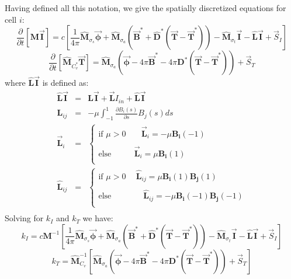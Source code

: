 \documentclass[11pt]{article}
\newcommand{\benum}{\begin{equation}}
\newcommand{\eenum}{\end{equation}}
\newcommand{\beanum}{\begin{eqnarray}}
\newcommand{\eeanum}{\end{eqnarray}}
\newcommand{\vect}[1]{\ensuremath{ \vec{\mathbf #1}}}
\newcommand{\B}[1]{\ensuremath{\mathbf{B_{#1} }}}
\newcommand{\p}{\ensuremath{ \partial}}
\newcommand{\M}{\ensuremath{ \mathbf M}}
\newcommand{\Mw}{\ensuremath{\widehat{\mathbf M}}}
\begin{document}
Having defined all this notation, we give the spatially discretized equations for cell $i$:
\benum
\frac{\p }{\p t}\left[\mathbf{M} \vect{I}  \right] = c\left[
\frac{1}{4\pi}\widehat{ \mathbf M}_{\sigma_s}\vect{\phi} + \widehat{\mathbf M}_{\sigma_a}\left(\vect{B}^* + \widehat{\mathbf D}^*\left(\vect{T} -\vect{T}^*  \right)   \right)- \widehat{\mathbf M}_{\sigma_t} \vect{I} - \widehat{ \mathbf L}\vect{I} + \vec{S}_I
\right]
\label{eq:disc-intensity}
\eenum
\benum
\frac{\p }{\p t}\left[\Mw_{C_v^*}\vect{T}   \right] = 
\Mw_{\sigma_a} \left(\vect{\phi} -4\pi\vect{B}^* - 4\pi\mathbf{D}^*\left( \vect{T} - \vect{T}^* \right)\right) + \vec{S}_T
\label{eq:disc-temperature}
\eenum
where $\widehat{ \mathbf L}\vect{I}$ is defined as:
\beanum
\widehat{\mathbf L}\vect{I} &=& \mathbf{L}\vect{I} + \vect{L}I_{in} + \hat{\mathbf L}\vect{I}\\
%
%
%
\mathbf{L}_{ij} &=& -\mu \int_{-1}^{1}{\frac{\p B_i(s)}{\p s}B_j(s) ds} \\
%
%
%
\vect{L}_i &=& \left \{
\begin{array}{cc}
\text{if }\mu>0  ~&~~~~ \vect{L}_i = -\mu \B{i}(-1) \\
~ & ~ \\
\text{else }     ~& \vect{L}_i = \mu \B{i}(1) \\
\end{array}
\right . \\
%
%
%
\hat{\mathbf L}_{ij} &=& \left \{
\begin{array}{cc}
\text{if }\mu>0  ~&~\hat{\mathbf L}_{ij} = \mu \B{i}(1) \B{j}(1) \\
~ & ~ \\
\text{else }     ~&~~~~~ \hat{\mathbf L}_{ij} = -\mu \B{i}(-1) \B{j}(-1) \\
\end{array}
\right . \\
\label{eq:divergence-op}
\eeanum
Solving for $k_I$ and $k_T$ we have:
\benum
k_I = c\M^{-1}\left[   
\frac{1}{4\pi}\Mw_{\sigma_s}\vect{\phi} + \Mw_{\sigma_a}\left(\vect{B}^* + \widehat{\mathbf D}^*\left(\vect{T} -\vect{T}^*  \right)   \right)- \widehat{\mathbf M}_{\sigma_t} \vect{I} - \widehat{ \mathbf L}\vect{I} + \vec{S}_I
\right]
\label{eq:kI}
\eenum
\benum
k_T = \Mw_{C_v}^{-1}\left[
\Mw_{\sigma_a} \left(\vect{\phi} - 4\pi\vect{B}^* - 4\pi\mathbf{D}^*\left( \vect{T} - \vect{T}^* \right)\right) + \vec{S}_T
\right]
\label{eq:kT}
\eenum
\end{document}
